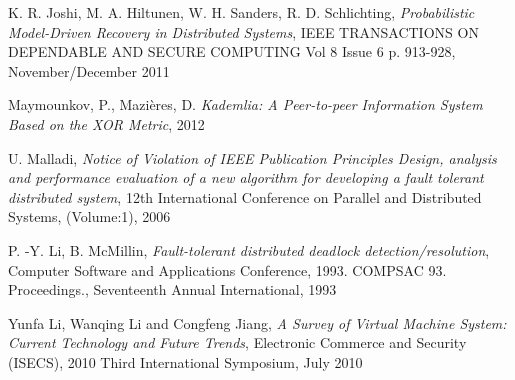 \documentclass{cslthse-msc}
\begin{document}
\begin{thebibliography}{50}
	K. R. Joshi, M. A. Hiltunen, W. H. Sanders, R. D. Schlichting,
	\emph{Probabilistic Model-Driven Recovery in Distributed Systems},
	IEEE TRANSACTIONS ON DEPENDABLE AND SECURE COMPUTING Vol 8 Issue 6 p. 913-928,
	November/December 2011
	
	Maymounkov, P., Mazières, D.
	\emph{Kademlia: A Peer-to-peer Information System Based on the XOR Metric}, 2012

	U. Malladi,
	\emph{Notice of Violation of IEEE Publication Principles Design, analysis and performance evaluation of a new algorithm for developing a fault tolerant distributed system},
	12th International Conference on Parallel and Distributed Systems, (Volume:1),
	2006

	P. -Y. Li, B. McMillin,
	\emph{Fault-tolerant distributed deadlock detection/resolution},
	Computer Software and Applications Conference, 1993. COMPSAC 93. Proceedings., Seventeenth Annual International,
	1993
	
	Yunfa Li, Wanqing Li and Congfeng Jiang,
	\emph{A Survey of Virtual Machine System: Current Technology and Future Trends},
	Electronic Commerce and Security (ISECS), 2010 Third International Symposium,
	July 2010

\end{thebibliography}
\end{document}
